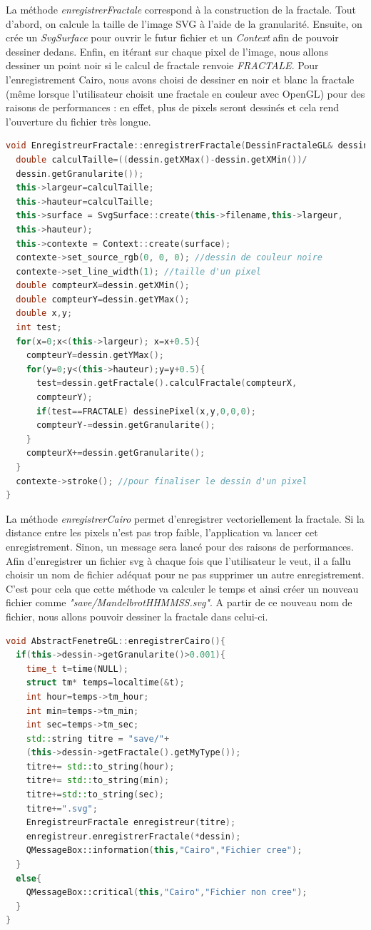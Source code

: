 \documentclass[a4]{article}
\begin{document}
La méthode \emph{enregistrerFractale} correspond à la construction de la fractale. 
Tout d'abord, on calcule la taille de l'image SVG à l'aide de la granularité. 
Ensuite, on crée un \emph{SvgSurface} pour ouvrir le futur fichier et un \emph{Context} afin de pouvoir dessiner dedans. 
Enfin, en itérant sur chaque pixel de l'image, nous allons dessiner un point noir si le calcul de fractale renvoie \emph{FRACTALE}. 
Pour l'enregistrement Cairo, nous avons choisi de dessiner en noir et blanc la fractale (même lorsque l'utilisateur choisit une fractale en couleur avec OpenGL)
pour des raisons de performances : en effet, plus de pixels seront dessinés et cela rend l'ouverture du fichier très longue. 

\begin{lstlisting}[language=c++]
void EnregistreurFractale::enregistrerFractale(DessinFractaleGL& dessin){
  double calculTaille=((dessin.getXMax()-dessin.getXMin())/
  dessin.getGranularite());
  this->largeur=calculTaille;
  this->hauteur=calculTaille;
  this->surface = SvgSurface::create(this->filename,this->largeur, 
  this->hauteur);
  this->contexte = Context::create(surface);
  contexte->set_source_rgb(0, 0, 0); //dessin de couleur noire
  contexte->set_line_width(1); //taille d'un pixel
  double compteurX=dessin.getXMin(); 
  double compteurY=dessin.getYMax();	
  double x,y;
  int test;
  for(x=0;x<(this->largeur); x=x+0.5){ 
    compteurY=dessin.getYMax();
    for(y=0;y<(this->hauteur);y=y+0.5){
      test=dessin.getFractale().calculFractale(compteurX,
      compteurY);
      if(test==FRACTALE) dessinePixel(x,y,0,0,0);
      compteurY-=dessin.getGranularite(); 
	}
	compteurX+=dessin.getGranularite();
  }
  contexte->stroke(); //pour finaliser le dessin d'un pixel
}
\end{lstlisting}

La méthode \emph{enregistrerCairo} permet d'enregistrer vectoriellement la fractale. 
Si la distance entre les pixels n'est pas trop faible, l'application va lancer cet enregistrement. Sinon, un message sera lancé pour des raisons de performances. 
Afin d'enregistrer un fichier svg à chaque fois que l'utilisateur le veut, il a fallu choisir un nom de fichier adéquat pour ne pas supprimer un autre enregistrement. 
C'est pour cela que cette méthode va calculer le temps et ainsi créer un nouveau fichier comme \emph{"save/MandelbrotHHMMSS.svg"}. A partir de ce nouveau nom de fichier, 
nous allons pouvoir dessiner la fractale dans celui-ci. 

\begin{lstlisting}[language=c++]
void AbstractFenetreGL::enregistrerCairo(){
  if(this->dessin->getGranularite()>0.001){ 
    time_t t=time(NULL);
    struct tm* temps=localtime(&t);
    int hour=temps->tm_hour;
    int min=temps->tm_min;
    int sec=temps->tm_sec; 
    std::string titre = "save/"+
    (this->dessin->getFractale().getMyType());
    titre+= std::to_string(hour);
    titre+= std::to_string(min);
    titre+=std::to_string(sec);
    titre+=".svg";
    EnregistreurFractale enregistreur(titre);
    enregistreur.enregistrerFractale(*dessin);
    QMessageBox::information(this,"Cairo","Fichier cree");
  }
  else{
    QMessageBox::critical(this,"Cairo","Fichier non cree");
  }
}
\end{lstlisting}
\end{document}
